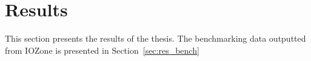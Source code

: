 
\chapter{Results}
\label{ch:results}

This section presents the results of the thesis. The benchmarking data outputted from IOZone is presented in Section~\ref{sec:res_bench}


